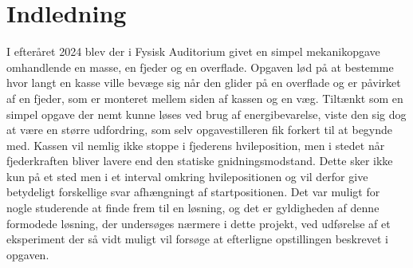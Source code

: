 \chapter{Indledning}
I efteråret 2024 blev der i Fysisk Auditorium givet en simpel mekanikopgave
omhandlende en masse, en fjeder og en overflade. Opgaven lød  på at bestemme hvor
langt en kasse ville bevæge sig når den glider på en overflade og er påvirket af en fjeder, 
som er monteret mellem siden af kassen og en væg. Tiltænkt som en simpel opgave der nemt kunne løses 
ved brug af energibevarelse, viste den sig dog at være en større udfordring, som selv opgavestilleren fik forkert til at begynde med.
Kassen vil nemlig ikke stoppe i fjederens hvileposition, men i stedet når fjederkraften bliver lavere end den statiske gnidningsmodstand. Dette sker ikke kun på et sted men
i et interval omkring hvilepositionen og vil derfor give betydeligt forskellige svar 
afhængningt af startpositionen. Det var muligt for nogle studerende at finde frem til en løsning, 
og det er gyldigheden af denne formodede løsning, 
der undersøges nærmere i dette projekt, ved udførelse af et eksperiment der så vidt muligt vil forsøge at efterligne opstillingen beskrevet i opgaven.